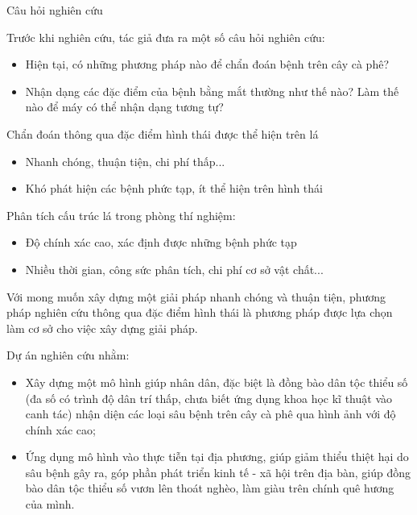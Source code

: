\documentclass{beamer}
\begin{document}
\begin{frame}[allowframebreaks]{Câu hỏi nghiên cứu}

	Trước khi nghiên cứu, tác giả đưa ra một số câu hỏi nghiên cứu:
	
	\begin{itemize}
		\item Hiện tại, có những phương pháp nào để chẩn đoán bệnh trên cây cà phê? 
		\item Nhận dạng các đặc điểm của bệnh bằng mắt thường như thế nào? Làm thế nào để máy có thể nhận dạng tương tự? 
	\end{itemize}

	\framebreak

	Chẩn đoán thông qua đặc điểm hình thái được thể hiện trên lá
	\begin{itemize}
		\item Nhanh chóng, thuận tiện, chi phí thấp...
		\item Khó phát hiện các bệnh phức tạp, ít thể hiện trên hình thái
	\end{itemize}

	Phân tích cấu trúc lá trong phòng thí nghiệm:
	\begin{itemize}
		\item Độ chính xác cao, xác định được những bệnh phức tạp
		\item Nhiều thời gian, công sức phân tích, chi phí cơ sở vật chất...
	\end{itemize}

	\framebreak
	Với mong muốn xây dựng một giải pháp nhanh chóng và thuận tiện, phương pháp nghiên cứu thông qua đặc điểm hình thái là phương pháp được lựa chọn làm cơ sở cho việc xây dựng giải pháp.

	\framebreak

	Dự án nghiên cứu nhằm:

	\begin{itemize}
		\item Xây dựng một mô hình giúp nhân dân, đặc biệt là đồng bào dân tộc thiểu số (đa số có trình độ dân trí thấp, chưa biết ứng dụng khoa học kĩ thuật vào canh tác) nhận diện các loại sâu bệnh trên cây cà phê qua hình ảnh với độ chính xác cao;
		\item Ứng dụng mô hình vào thực tiễn tại địa phương, giúp giảm thiểu thiệt hại do sâu bệnh gây ra, góp phần phát triển kinh tế - xã hội trên địa bàn, giúp đồng bào dân tộc thiểu số vươn lên thoát nghèo, làm giàu trên chính quê hương của mình.
	\end{itemize}

\end{frame}
\end{document}
